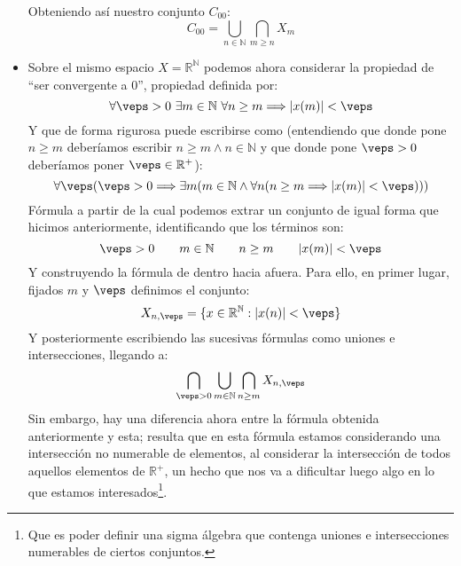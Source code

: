 \begin{ejemplo}
\begin{itemize}
\begin{equation*}
            \end{equation*}
            Obteniendo así nuestro conjunto $C_{00}$:
            \begin{equation*}
                C_{00} = \bigcup_{n\in \mathbb{N}}\bigcap_{m\geq n} X_m
            \end{equation*}
        \item Sobre el mismo espacio $X= \mathbb{R}^\mathbb{N}$ podemos ahora considerar la propiedad de ``ser convergente a 0'', propiedad definida por:
            \begin{equation}\label{eq:conv_0}
                \forall \veps > 0\ \exists m\in \mathbb{N}\ \forall n\geq m \Longrightarrow |x(m)| < \veps
            \end{equation}
            Y que de forma rigurosa puede escribirse como (entendiendo que donde pone $n\geq m$ deberíamos escribir $n\geq m \land n\in \mathbb{N}$ y que donde pone $\veps > 0$ deberíamos poner $\veps \in \mathbb{R}^+$):
            \begin{equation*}
                \forall \veps(\veps > 0 \Longrightarrow \exists m(m\in \mathbb{N} \land \forall n(n\geq m \Longrightarrow |x(m)|<\veps)))
            \end{equation*}
            Fórmula a partir de la cual podemos extrar un conjunto de igual forma que hicimos anteriormente, identificando que los términos son:
            \begin{equation*}
                \veps > 0 \qquad m\in \mathbb{N} \qquad n\geq m \qquad |x(m)|<\veps
            \end{equation*}
            Y construyendo la fórmula de dentro hacia afuera. Para ello, en primer lugar, fijados $m$ y $\veps$ definimos el conjunto:
            \begin{equation*}
                X_{n,\veps} = \{x\in \mathbb{R}^\mathbb{N} : |x(n)|<\veps\}
            \end{equation*}
            Y posteriormente escribiendo las sucesivas fórmulas como uniones e intersecciones, llegando a:
            \begin{equation*}
                \bigcap_{\veps > 0} \bigcup_{m\in \mathbb{N}} \bigcap_{n\geq m} X_{n,\veps}
            \end{equation*}
            Sin embargo, hay una diferencia ahora entre la fórmula obtenida anteriormente y esta; resulta que en esta fórmula estamos considerando una intersección no numerable de elementos, al considerar la intersección de todos aquellos elementos de $\mathbb{R}^+$, un hecho que nos va a dificultar luego algo en lo que estamos interesados\footnote{Que es poder definir una sigma álgebra que contenga uniones e intersecciones numerables de ciertos conjuntos.}.


\end{itemize}
\end{ejemplo}
